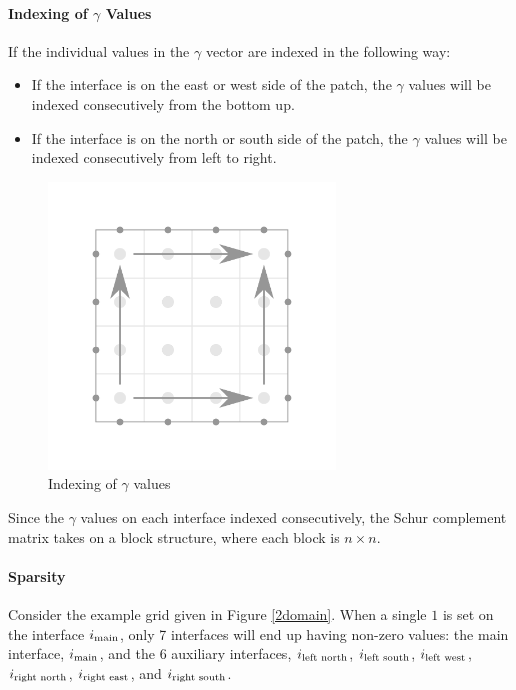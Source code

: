 \documentclass[12pt]{article}
\begin{document}
\paragraph{Indexing of $\gamma$ Values} 
If the individual values in the $\gamma$ vector are indexed in the following way:
\begin{itemize}
    \item If the interface is on the east or west side of the patch, the $\gamma$ values will be indexed consecutively from the bottom up.
    \item If the interface is on the north or south side of the patch, the $\gamma$ values will be indexed consecutively from left to right.
\end{itemize}
\begin{figure}[H]
    \centering
    \includegraphics[width=3in]{images/indexing.pdf}
    \caption{Indexing of $\gamma$ values}
\end{figure}
Since the $\gamma$ values on each interface indexed consecutively, the Schur complement matrix takes
on a block structure, where each block is $n\times n$.
\paragraph{Sparsity}

Consider the example grid given in Figure \ref{2domain}.
When a single $1$ is set on the interface $i_{\textnormal{main}}$, only 7 interfaces will end up
having non-zero values: the main interface, $i_{\textnormal{main}}$, and the 6 auxiliary
interfaces, 
$i_{\textnormal{left north}}$, $i_{\textnormal{left south}}$, $i_{\textnormal{left west}}$,
$i_{\textnormal{right north}}$, $i_{\textnormal{right east}}$, and $i_{\textnormal{right south}}$.
\end{document}
